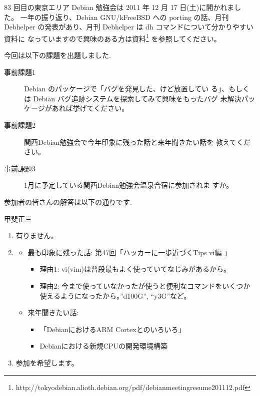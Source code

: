 \documentclass[mingoth,a4paper]{jsarticle}
\begin{document}
83 回目の東京エリア Debian 勉強会は 2011 年 12 月 17 日(土)に開かれまし
た。
一年の振り返り、Debian GNU/kFreeBSD への porting の話、月刊 Debhelper
の発表があり、月刊 Debhelper は dh コマンドについて分かりやすい資料に
なっていますので興味のある方は資料\footnote{http://tokyodebian.alioth.debian.org/pdf/debianmeetingresume201112.pdf}
を参照してください。

\clearpage


今回は以下の課題を出題しました.
\begin{screen}
  \begin{description}
  \item[事前課題1] Debian のパッケージで「バグを発見した、けど放置してい
    る」、もしくは Debian バグ追跡システムを探索してみて興味をもったバグ
    未解決パッケージがあれば挙げてください。
  \item[事前課題2] 関西Debian勉強会で今年印象に残った話と来年聞きたい話を
    教えてください。
  \item [事前課題3] 1月に予定している関西Debian勉強会温泉合宿に参加されま
    すか。
  \end{description}
\end{screen}

参加者の皆さんの解答は以下の通りです.

\begin{prework}{ 甲斐正三 }
  \begin{enumerate}
  \item 有りません。
  \item
    \begin{itemize}
    \item 最も印象に残った話: 第47回「ハッカーに一歩近づくTips vi編 」
      \begin{itemize}
      \item 理由1: vi(vim)は普段最もよく使っていてなじみがあるから。
      \item 理由2: 今まで使っていなかったが使うと便利なコマンドをいくつか使えるようになったから。''d100G'', ``y3G''など。
      \end{itemize}
    \item 来年聞きたい話:
      \begin{itemize}
      \item 「DebianにおけるARM Cortexとのいろいろ」
      \item Debianにおける新規CPUの開発環境構築
      \end{itemize}
    \end{itemize}
  \item 参加を希望します。
  \end{enumerate}
\end{prework}
\end{document}
